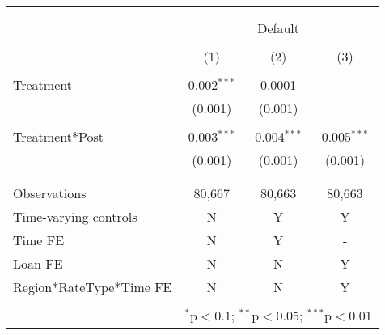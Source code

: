 
\begin{tabular}{@{\extracolsep{5pt}}lccc} 
\\[-1.8ex]\hline 
\hline \\[-1.8ex] 
\\[-1.8ex] & \multicolumn{3}{c}{Default} \\ 
\\[-1.8ex] & (1) & (2) & (3)\\ 
\hline \\[-1.8ex] 
 Treatment & 0.002$^{***}$ & 0.0001 &  \\ 
  & (0.001) & (0.001) &  \\ 
  & & & \\ 
 Treatment$*$Post & 0.003$^{***}$ & 0.004$^{***}$ & 0.005$^{***}$ \\ 
  & (0.001) & (0.001) & (0.001) \\ 
  & & & \\ 
\hline \\[-1.8ex] 
Observations & 80,667 & 80,663 & 80,663 \\ 
\hline 
Time-varying controls & N & Y  & Y \\
Time FE & N & Y & -\\
Loan FE & N & N & Y \\
Region$*$RateType$*$Time FE& N & N & Y \\
\hline \\[-1.8ex] 
& \multicolumn{3}{r}{$^{*}$p$<$0.1; $^{**}$p$<$0.05; $^{***}$p$<$0.01} \\ 
\end{tabular} 
